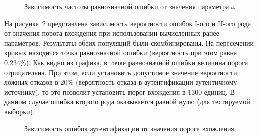 \begin{figure}[ht!]
\caption{Зависимость частоты равнозначной ошибки от значения параметра $\omega$}
\label{fig:eer_from_w}
\end{figure}


На рисунке~\ref{fig:overall} представлена зависимость вероятности ошибок I-ого и II-ого рода от значения порога вхождения при использовании вычисленных ранее параметров. Результаты обеих популяций были скомбинированы.
На пересечении кривых находится точка равнозначной ошибки (вероятность при этом равна 0.234\%). Как видно из графика, в точке равнозначной ошибки величина порога отрицательна. При этом, если установить допустимое значение вероятности ложных отказов в 20\% (вероятность отказа в аутентификации аутентичному источнику), то это позволит установить порог вхождения в 1300 единиц. В данном случае ошибка второго рода оказывается равной нулю (для тестируемой выборки).

\begin{figure}[ht!]
\caption{Зависимость ошибок аутентификации от значения порога вхождения}
\label{fig:overall}
\end{figure}

